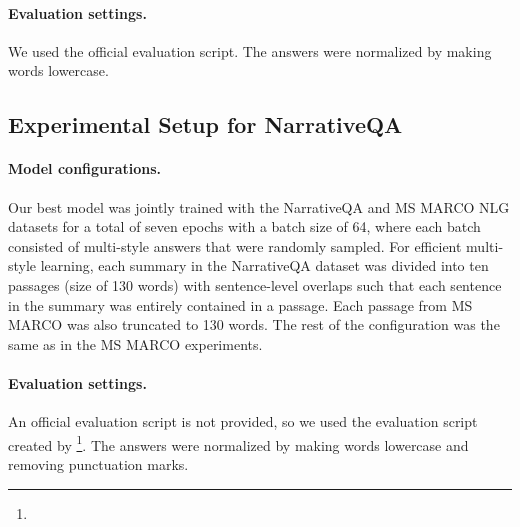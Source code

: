 \documentclass[11pt,a4paper]{article}
\theoremstyle{mydef}
\theoremstyle{myprob}
\begin{document}

\paragraph{Evaluation settings.}
We used the official evaluation script. %
The answers were normalized by making words lowercase. 

\subsection{Experimental Setup for NarrativeQA}
\label{sec:setup2}

\paragraph{Model configurations.}
Our best model was jointly trained with 
 the NarrativeQA and MS MARCO NLG datasets for a total of seven epochs with a batch size of 64, where each batch 
 consisted of multi-style answers that were randomly sampled.
 For efficient multi-style learning, each summary in the NarrativeQA dataset was divided into ten passages (size of 130 words) with sentence-level overlaps such that each sentence in the summary was entirely contained in a passage.  Each passage from MS MARCO was also truncated to 130 words.
The rest of the configuration was the same as in the MS MARCO experiments.

\paragraph{Evaluation settings.}

An official evaluation script is not provided, so we used the evaluation script created by \citet{BauerWB18}%
\footnote{}. 
The answers were normalized 
by
making words lowercase and removing punctuation marks.

\end{document}

